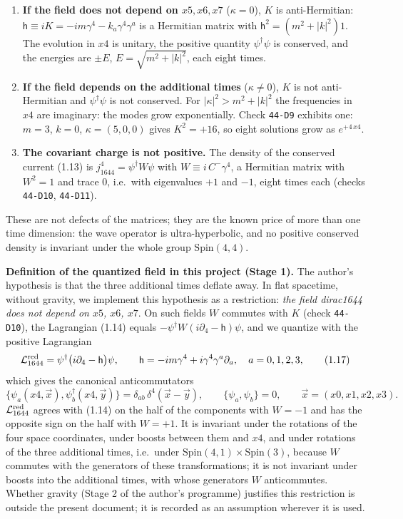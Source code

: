 \documentclass[
  10pt,
]{article}
\providecommand{\tightlist}{%
  \setlength{\itemsep}{0pt}\setlength{\parskip}{0pt}}
\begin{document}
\begin{enumerate}
\def\labelenumi{\arabic{enumi}.}
\tightlist
\item
  \textbf{If the field does not depend on \(x5,x6,x7\)} (\(\kappa=0\)),
  \(K\) is anti-Hermitian:
  \(\mathsf{h}\equiv iK=-im\gamma^4-k_a\gamma^4\gamma^a\) is a Hermitian
  matrix with \(\mathsf{h}^2=(m^2+|k|^2)1\). The evolution in \(x4\) is
  unitary, the positive quantity \(\psi^\dagger\psi\) is conserved, and
  the energies are \(\pm E\), \(E=\sqrt{m^2+|k|^2}\), each eight times.
\item
  \textbf{If the field depends on the additional times}
  (\(\kappa\neq0\)), \(K\) is not anti-Hermitian and
  \(\psi^\dagger\psi\) is not conserved. For \(|\kappa|^2>m^2+|k|^2\)
  the frequencies in \(x4\) are imaginary: the modes grow exponentially.
  Check \texttt{44-D9} exhibits one: \(m=3\), \(k=0\),
  \(\kappa=(5,0,0)\) gives \(K^2=+16\), so eight solutions grow as
  \(e^{+4\,x4}\).
\item
  \textbf{The covariant charge is not positive.} The density of the
  conserved current (1.13) is \(j_{1644}^4=\psi^\dagger W\psi\) with
  \(W\equiv i\,C^{-}\gamma^4\), a Hermitian matrix with \(W^2=1\) and
  trace 0, i.e.~with eigenvalues \(+1\) and \(-1\), eight times each
  (checks \texttt{44-D10}, \texttt{44-D11}).
\end{enumerate}

These are not defects of the matrices; they are the known price of more
than one time dimension: the wave operator is ultra-hyperbolic, and no
positive conserved density is invariant under the whole group
\(\mathrm{Spin}(4,4)\).

\textbf{Definition of the quantized field in this project (Stage 1).}
The author's hypothesis is that the three additional times deflate away.
In flat spacetime, without gravity, we implement this hypothesis as a
restriction: \emph{the field dirac1644 does not depend on \(x5\),
\(x6\), \(x7\)}. On such fields \(W\) commutes with \(K\) (check
\texttt{44-D10}), the Lagrangian (1.14) equals
\(-\psi^\dagger W(i\partial_4-\mathsf{h})\psi\), and we quantize with
the positive Lagrangian
\[\mathcal{L}^{\rm red}_{1644}=\psi^\dagger\big(i\partial_4-\mathsf{h}\big)\psi,\qquad\mathsf{h}=-im\gamma^4+i\gamma^4\gamma^a\partial_a,\quad a=0,1,2,3,\tag{1.17}\]
which gives the canonical anticommutators
\[\{\psi_a(x4,\vec x),\psi_b^\dagger(x4,\vec y)\}=\delta_{ab}\,\delta^4(\vec x-\vec y),\qquad\{\psi_a,\psi_b\}=0,\qquad\vec x=(x0,x1,x2,x3).\tag{1.18}\]
\(\mathcal{L}^{\rm red}_{1644}\) agrees with (1.14) on the half of the
components with \(W=-1\) and has the opposite sign on the half with
\(W=+1\). It is invariant under the rotations of the four space
coordinates, under boosts between them and \(x4\), and under rotations
of the three additional times, i.e.~under
\(\mathrm{Spin}(4,1)\times\mathrm{Spin}(3)\), because \(W\) commutes
with the generators of these transformations; it is not invariant under
boosts into the additional times, with whose generators \(W\)
anticommutes. Whether gravity (Stage 2 of the author's programme)
justifies this restriction is outside the present document; it is
recorded as an assumption wherever it is used.
\end{document}
